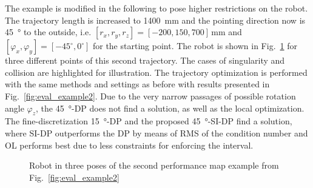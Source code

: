 \documentclass[runningheads]{llncs}
\begin{document}
The example is modified in the following to pose higher restrictions on the robot.
The trajectory length is increased to \SI{1400}{\milli\metre} and the pointing direction now is \SI{45}{\degree} to the outside, i.e. $[r_x, r_y, r_z]=[-200, 150, 700]$\,mm and $[\varphi_x, \varphi_y]=[-45^\circ,0^\circ]$ for the starting point.
The robot is shown in Fig.~\ref{fig:example2_robot} for three different points of this second trajectory.
The cases of singularity and collision are highlighted for illustration.
The trajectory optimization is performed with the same methods and settings as before with results presented in Fig.~\ref{fig:eval_example2}.
Due to the very narrow passages of possible rotation angle $\varphi_z$, the \SI{45}{\degree}-DP does not find a solution, as well as the local optimization.
The fine-discretization \SI{15}{\degree}-DP and the proposed \SI{45}{\degree}-SI-DP find a solution, where SI-DP outperforms the DP by means of RMS of the condition number and OL performs best due to less constraints for enforcing the interval.


\begin{figure}[htb]
\centering

\vspace{-0.3cm}
\caption{Robot in three poses of the second performance map example from Fig.~\ref{fig:eval_example2}}
\label{fig:example2_robot}
\end{figure}
\end{document}
